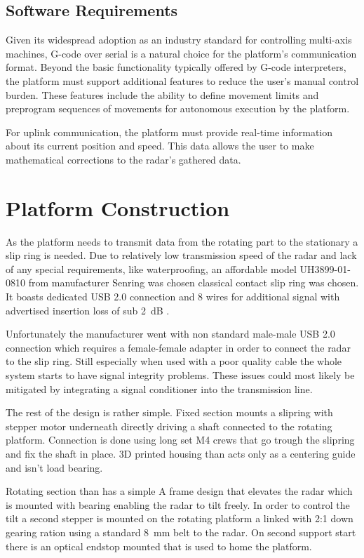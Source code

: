 \subsection{Software Requirements}

Given its widespread adoption as an industry standard for controlling multi-axis machines, G-code over serial is a natural choice for the platform's communication format. Beyond the basic functionality typically offered by G-code interpreters, the platform must support additional features to reduce the user's manual control burden. These features include the ability to define movement limits and preprogram sequences of movements for autonomous execution by the platform.

For uplink communication, the platform must provide real-time information about its current position and speed. This data allows the user to make mathematical corrections to the radar's gathered data.


\section{Platform Construction}

As the platform needs to transmit data from the rotating part to the stationary a slip ring is needed.
Due to relatively low transmission speed of the radar and lack of any special requirements, like waterproofing, an affordable model UH3899-01-0810 from manufacturer Senring was chosen classical contact slip ring was chosen.
It boasts dedicated USB 2.0 connection and 8 wires for additional signal with advertised insertion loss of sub 2~dB \cite{slipring}.

Unfortunately the manufacturer went with non standard male-male USB 2.0 connection which requires a female-female adapter in order to connect the radar to the slip ring.
Still especially when used with a poor quality cable the whole system starts to have signal integrity problems.
These issues could most likely be mitigated by integrating a signal conditioner into the transmission line.

The rest of the design is rather simple.
Fixed section mounts a slipring with stepper motor underneath directly driving a shaft connected to the rotating platform.
Connection is done using long set M4 crews that go trough the slipring and fix the shaft in place.
3D printed housing than acts only as a centering guide and isn't load bearing.

Rotating section than has a simple A frame design that elevates the radar which is mounted with bearing enabling the radar to tilt freely.
In order to control the tilt a second stepper is mounted on the rotating platform a linked with 2:1 down gearing ration using a standard 8~mm belt to the radar.
On second support start there is an optical endstop mounted that is used to home the platform.


